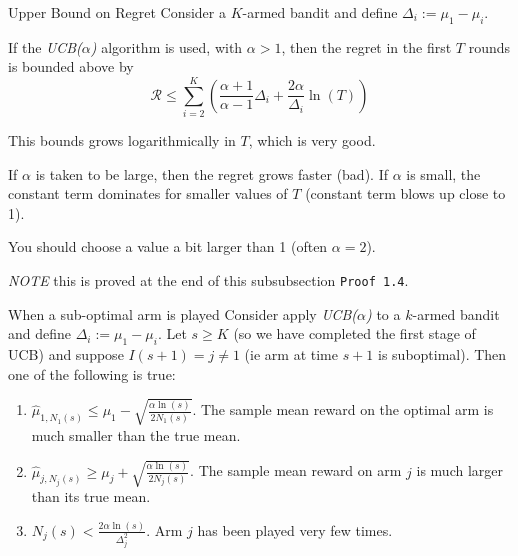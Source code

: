 \documentclass[11pt,a4paper]{article}
\begin{document}
  \begin{theorem}{Upper Bound on Regret}
    Consider a $K$-armed bandit and define $\Delta_i:=\mu_1-\mu_i$.
    \par If the \textit{UCB($\alpha$)} algorithm is used, with $\alpha>1$, then the regret in the first $T$ rounds is bounded above by
    \[ \mathcal{R}\leq\sum_{i=2}^K\left(\frac{\alpha+1}{\alpha-1}\Delta_i+\frac{2\alpha}{\Delta_i}\ln(T)\right) \]
    \par This bounds grows logarithmically in $T$, which is very good.
    \par If $\alpha$ is taken to be large, then the regret grows faster (bad). If $\alpha$ is small, the constant term dominates for smaller values of $T$ (constant term blows up close to 1).
    \par You should choose a value a bit larger than 1 (often $\alpha=2$).
    \par \textit{NOTE} this is proved at the end of this subsubsection \texttt{Proof 1.4}.
  \end{theorem}

  \begin{theorem}{When a sub-optimal arm is played}
    Consider apply \textit{UCB($\alpha$)} to a $k$-armed bandit and define $\Delta_i:=\mu_1-\mu_i$.
    Let $s\geq K$ (so we have completed the first stage of UCB) and suppose $I(s+1)=j\neq 1$ (ie arm at time $s+1$ is suboptimal). Then one of the following is true:
    \begin{enumerate}
      \item $\hat\mu_{1,N_1(s)}\leq\mu_1-\displaystyle\sqrt{\frac{\alpha\ln(s)}{2N_1(s)}}$. The sample mean reward on the optimal arm is much smaller than the true mean.
      \item $\hat\mu_{j,N_j(s)}\geq\mu_j+\displaystyle\sqrt{\frac{\alpha\ln(s)}{2N_j(s)}}$. The sample mean reward on arm $j$ is much larger than its true mean.
      \item $N_j(s)<\displaystyle\frac{2\alpha\ln(s)}{\Delta_j^2}$. Arm $j$ has been played very few times.
    \end{enumerate}
  \end{theorem}
\end{document}
